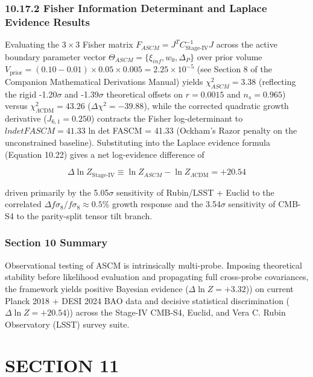 \documentclass[aps,prd,onecolumn,superscriptaddress,nofootinbib,longbibliography,10pt]{revtex4-2}
\begin{document}
  
\subsubsection*{10.17.2 Fisher Information Determinant and Laplace Evidence Results}

  Evaluating the \(3 \times 3\) Fisher matrix \(F_{ASCM} = J^T C_{\text{Stage-IV}}^{-1} J\) across the active boundary parameter vector \(\Theta_{ASCM} = \{\xi_{inf}, w_0, \Delta_P\}\) over prior volume \(V_{\text{prior}} = (0.10 - 0.01) \times 0.05 \times 0.005 = 2.25 \times 10^{-5}\) (see Section 8 of the Companion Mathematical Derivations Manual) yields \(\chi^2_{ASCM} = 3.38\) (reflecting the rigid -1.20$\sigma$ and -1.39$\sigma$ theoretical offsets on \(r = 0.0015\) and \(n_s = 0.965\)) versus \(\chi^2_{\Lambda\mathrm{CDM}} = 43.26\) (\(\Delta\chi^2 = -39.88\)), while the corrected quadratic growth derivative (\(J_{6,1} = 0.250\)) contracts the Fisher log-determinant to $ln det FASCM = 41.33$ ln det FASCM = 41.33 (Ockham's Razor penalty on the unconstrained baseline). Substituting into the Laplace evidence formula (Equation 10.22) gives a net log-evidence difference of


\[\Delta \ln Z_{\text{Stage-IV}} \equiv \ln Z_{ASCM} - \ln Z_{\Lambda\mathrm{CDM}} = +20.54\]


driven primarily by the 5.05$\sigma$ sensitivity of Rubin/LSST + Euclid to the correlated \(\Delta f\sigma_8/f\sigma_8 \approx 0.5\%\) growth response and the 3.54$\sigma$ sensitivity of CMB-S4 to the parity-split tensor tilt branch.


  
\subsubsection*{Section 10 Summary}

  Observational testing of ASCM is intrinsically multi-probe. Imposing theoretical stability before likelihood evaluation and propagating full cross-probe covariances, the framework yields positive Bayesian evidence (\(\Delta \ln Z = +3.32\))) on current Planck 2018 + DESI 2024 BAO data and decisive statistical discrimination (\(\Delta \ln Z = +20.54\))) across the Stage-IV CMB-S4, Euclid, and Vera C. Rubin Observatory (LSST) survey suite.




 

  
\section*{SECTION 11}
\end{document}
